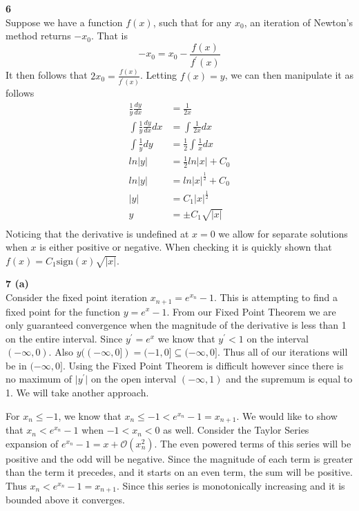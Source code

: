 \documentclass[12pt]{article}
\newcommand{\problem}[1]{\hspace{-4 ex} \large \textbf{#1}\\}
\begin{document}
	
\problem{6} 
	Suppose we have a function $f(x)$, such that for any $x_0$, an iteration of Newton's method returns $-x_0$. That is 
	$$
	-x_0 = x_0 - \frac{f(x)}{f^\prime(x)}
	$$
	It then follows that $2x_0 = \frac{f(x)}{f^\prime(x)}$. Letting $f(x)=y$, we can then manipulate it as follows
	\begin{align*}
		\frac{1}{y}\frac{dy}{dx} & = \frac{1}{2x} \\
		\int \frac{1}{y}\frac{dy}{dx} dx & = \int \frac{1}{2x} dx \\
		\int \frac{1}{y}dy & = \frac{1}{2}\int \frac{1}{x} dx \\
		ln\vert y \vert & = \frac{1}{2} ln\vert x \vert + C_0 \\
		ln\vert y \vert & = ln\vert x \vert^\frac{1}{2} + C_0 \\
		\vert y \vert & = C_1 \vert x \vert^\frac{1}{2} \\
		y & = \pm C_1 \sqrt{\vert x \vert} \\
	\end{align*}
	Noticing that the derivative is undefined at $x=0$ we allow for separate solutions when $x$ is either positive or negative. When checking it is quickly shown that $f(x)=C_1 \text{sign}(x)\sqrt{\vert x \vert}$.

\problem{7 (a)}
	Consider the fixed point iteration $x_{n+1}=e^{x_n}-1$. This is attempting to find a fixed point for the function $y=e^x-1$. From our Fixed Point Theorem we are only guaranteed convergence when the magnitude of the derivative is less than 1 on the entire interval. Since $y^\prime=e^x$ we know that $y^\prime<1$ on the interval $(-\infty,0)$. Also $y((-\infty,0]) = (-1,0] \subseteq (-\infty,0]$. Thus all of our iterations will be in $(-\infty,0]$. Using the Fixed Point Theorem is difficult however since there is no maximum of $\vert y^\prime \vert $ on the open interval $(-\infty,1)$ and the supremum is equal to 1. We will take another approach. \bigbreak
	
	For $x_n\leq-1$, we know that $x_n\leq-1< e^{x_n}-1 = x_{n+1}$. We would like to show that $x_n<e^{x_n}-1$ when $-1 < x_n < 0$ as well. Consider the Taylor Series expansion of $e^{x_n}-1 = x + \mathcal{O}(x_n^2)$. The even powered terms of this series will be positive and the odd will be negative. Since the magnitude of each term is greater than the term it precedes, and it starts on an even term, the sum will be positive. Thus $x_n<e^{x_n}-1=x_{n+1}$. Since this series is monotonically increasing and it is bounded above it converges. \bigbreak
	
\end{document}
